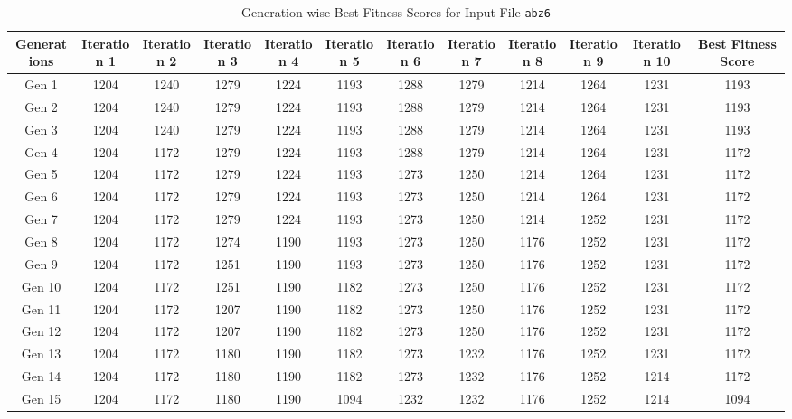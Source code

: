 \documentclass[12pt]{article}
\begin{document}
\begin{table}[h]
    \centering
    \caption{Generation-wise Best Fitness Scores for Input File \texttt{abz6}}
    \label{tab:best_fitness_scores_abz6}
    \begin{adjustbox}{max width=0.97\textwidth} %
        \begin{tabular}{*{12}{c}}
            \toprule
            Generations & Iteration 1 & Iteration 2 & Iteration 3 & Iteration 4 & Iteration 5 & Iteration 6 & Iteration 7 & Iteration 8 & Iteration 9 & Iteration 10 & Best Fitness Score \\
            \midrule
            Gen 1 & 1204 & 1240 & 1279 & 1224 & 1193 & 1288 & 1279 & 1214 & 1264 & 1231 & 1193 \\
            Gen 2 & 1204 & 1240 & 1279 & 1224 & 1193 & 1288 & 1279 & 1214 & 1264 & 1231 & 1193 \\
            Gen 3 & 1204 & 1240 & 1279 & 1224 & 1193 & 1288 & 1279 & 1214 & 1264 & 1231 & 1193 \\
            Gen 4 & 1204 & 1172 & 1279 & 1224 & 1193 & 1288 & 1279 & 1214 & 1264 & 1231 & 1172 \\
            Gen 5 & 1204 & 1172 & 1279 & 1224 & 1193 & 1273 & 1250 & 1214 & 1264 & 1231 & 1172 \\
            Gen 6 & 1204 & 1172 & 1279 & 1224 & 1193 & 1273 & 1250 & 1214 & 1264 & 1231 & 1172 \\
            Gen 7 & 1204 & 1172 & 1279 & 1224 & 1193 & 1273 & 1250 & 1214 & 1252 & 1231 & 1172 \\
            Gen 8 & 1204 & 1172 & 1274 & 1190 & 1193 & 1273 & 1250 & 1176 & 1252 & 1231 & 1172 \\
            Gen 9 & 1204 & 1172 & 1251 & 1190 & 1193 & 1273 & 1250 & 1176 & 1252 & 1231 & 1172 \\
            Gen 10 & 1204 & 1172 & 1251 & 1190 & 1182 & 1273 & 1250 & 1176 & 1252 & 1231 & 1172 \\
            Gen 11 & 1204 & 1172 & 1207 & 1190 & 1182 & 1273 & 1250 & 1176 & 1252 & 1231 & 1172 \\
            Gen 12 & 1204 & 1172 & 1207 & 1190 & 1182 & 1273 & 1250 & 1176 & 1252 & 1231 & 1172 \\
            Gen 13 & 1204 & 1172 & 1180 & 1190 & 1182 & 1273 & 1232 & 1176 & 1252 & 1231 & 1172 \\
            Gen 14 & 1204 & 1172 & 1180 & 1190 & 1182 & 1273 & 1232 & 1176 & 1252 & 1214 & 1172 \\
            Gen 15 & 1204 & 1172 & 1180 & 1190 & 1094 & 1232 & 1232 & 1176 & 1252 & 1214 & 1094 \\

\end{tabular}
\end{adjustbox}
\end{table}
\end{document}
